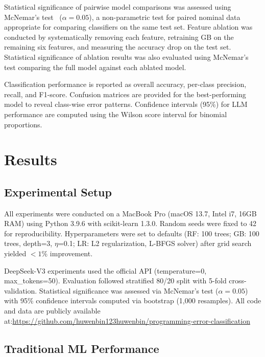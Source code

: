 \documentclass[10pt,a4paper]{article}
\begin{document}
Statistical significance of pairwise model comparisons was assessed using
McNemar's test~\cite{mcnemar1947note} ($\alpha = 0.05$), a non-parametric test
for paired nominal data appropriate for comparing classifiers on the same test
set. Feature ablation was conducted by systematically removing each feature,
retraining GB on the remaining six features, and measuring the accuracy
drop on the test set. Statistical significance of ablation results was also
evaluated using McNemar's test comparing the full model against each ablated
model.

Classification performance is reported as overall accuracy, per-class
precision, recall, and F1-score. Confusion matrices are provided for the
best-performing model to reveal class-wise error patterns. Confidence
intervals (95\%) for LLM performance are computed using the Wilson score
interval for binomial proportions.

\section{Results}

\subsection{Experimental Setup}

All experiments were conducted on a MacBook Pro (macOS 13.7, Intel i7, 16GB
RAM) using Python 3.9.6 with scikit-learn 1.3.0. Random seeds were fixed to
42 for reproducibility. Hyperparameters were set to defaults (RF: 100 trees;
GB: 100 trees, depth=3, $\eta$=0.1; LR: L2 regularization, L-BFGS solver)
after grid search yielded $<1\%$ improvement.

DeepSeek-V3 experiments used the official API (temperature=0,
max\_tokens=50). Evaluation followed stratified 80/20 split with 5-fold
cross-validation. Statistical significance was assessed via McNemar's test
($\alpha=0.05$) with 95\% confidence intervals computed via bootstrap (1,000
resamples). All code and data are publicly available
at:\url{https://github.com/huwenbin123huwenbin/programming-error-classification}

\subsection{Traditional ML Performance}
\end{document}

